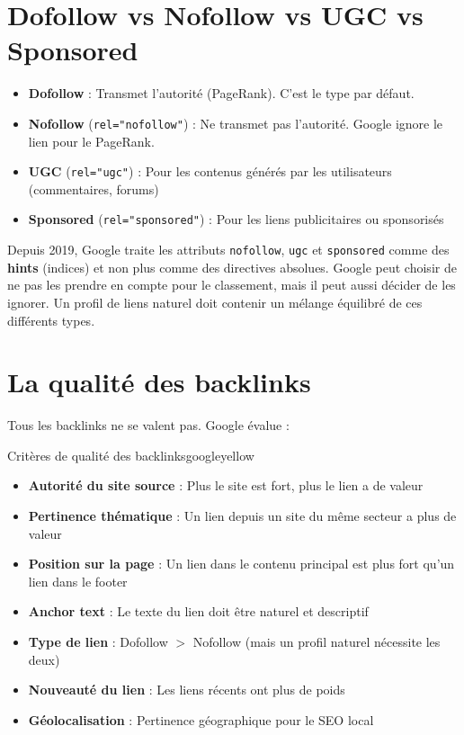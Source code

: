 \documentclass[12pt,a4paper,twoside]{report}
\newcommand{\keyword}[1]{\textbf{\textcolor{googleblue}{#1}}}
\begin{document}
\section{Dofollow vs Nofollow vs UGC vs Sponsored}

\begin{itemize}
    \item \textbf{Dofollow} : Transmet l'autorité (PageRank). C'est le type par défaut.
    \item \textbf{Nofollow} (\texttt{rel="nofollow"}) : Ne transmet pas l'autorité. Google ignore le lien pour le PageRank.
    \item \textbf{UGC} (\texttt{rel="ugc"}) : Pour les contenus générés par les utilisateurs (commentaires, forums)
    \item \textbf{Sponsored} (\texttt{rel="sponsored"}) : Pour les liens publicitaires ou sponsorisés
\end{itemize}

Depuis 2019, Google traite les attributs \texttt{nofollow}, \texttt{ugc} et \texttt{sponsored} comme des \keyword{hints} (indices) et non plus comme des directives absolues. Google peut choisir de ne pas les prendre en compte pour le classement, mais il peut aussi décider de les ignorer. Un profil de liens naturel doit contenir un mélange équilibré de ces différents types.

\section{La qualité des backlinks}

Tous les backlinks ne se valent pas. Google évalue :

\begin{mybox}{Critères de qualité des backlinks}{googleyellow}
\begin{itemize}
    \item \textbf{Autorité du site source} : Plus le site est fort, plus le lien a de valeur
    \item \textbf{Pertinence thématique} : Un lien depuis un site du même secteur a plus de valeur
    \item \textbf{Position sur la page} : Un lien dans le contenu principal est plus fort qu'un lien dans le footer
    \item \textbf{Anchor text} : Le texte du lien doit être naturel et descriptif
    \item \textbf{Type de lien} : Dofollow $>$ Nofollow (mais un profil naturel nécessite les deux)
    \item \textbf{Nouveauté du lien} : Les liens récents ont plus de poids
    \item \textbf{Géolocalisation} : Pertinence géographique pour le SEO local
\end{itemize}
\end{mybox}
\end{document}
